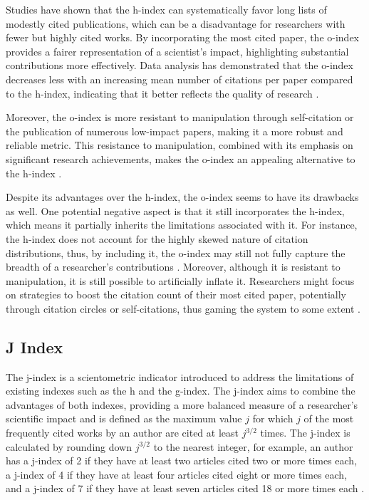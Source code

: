 Studies have shown that the h-index can systematically favor long lists of
modestly cited publications, which can be a disadvantage for researchers with
fewer but highly cited works. By incorporating the most cited paper, the
o-index provides a fairer representation of a scientist's impact, highlighting
substantial contributions more effectively. Data analysis has demonstrated that
the o-index decreases less with an increasing mean number of citations per
paper compared to the h-index, indicating that it better reflects the quality
of research \cite{dorogovtsev2015ranking}.

Moreover, the o-index is more resistant to manipulation through self-citation
or the publication of numerous low-impact papers, making it a more robust and
reliable metric. This resistance to manipulation, combined with its emphasis on
significant research achievements, makes the o-index an appealing alternative
to the h-index \cite{dorogovtsev2015ranking}.

Despite its advantages over the h-index, the o-index seems to have its
drawbacks as well. One potential negative aspect is that it still incorporates
the h-index, which means it partially inherits the limitations associated with
it. For instance, the h-index does not account for the highly skewed nature of
citation distributions, thus, by including it, the o-index may still not fully
capture the breadth of a researcher's contributions \cite{dorogovtsev2015ranking}.
Moreover, although it is resistant to manipulation, it is still possible to
artificially inflate it. Researchers might focus on strategies to boost the
citation count of their most cited paper, potentially through citation circles
or self-citations, thus gaming the system to some extent
\cite{dorogovtsev2015ranking}.

\subsection{J Index}
The j-index is a scientometric indicator introduced to address the limitations
of existing indexes such as the h and the g-index. The j-index aims to combine
the advantages of both indexes, providing a more balanced measure of a
researcher's scientific impact and is defined as the maximum value $j$ for
which $j$ of the most frequently cited works by an author are cited at least
$j^{3/2}$ times. The j-index is calculated by rounding down $j^{3/2}$ to the
nearest integer, for example, an author has a j-index of 2 if they have at
least two articles cited two or more times each, a j-index of 4 if they have at
least four articles cited eight or more times each, and a j-index of 7 if they
have at least seven articles cited 18 or more times each
\cite{mikhailov2014new}.

